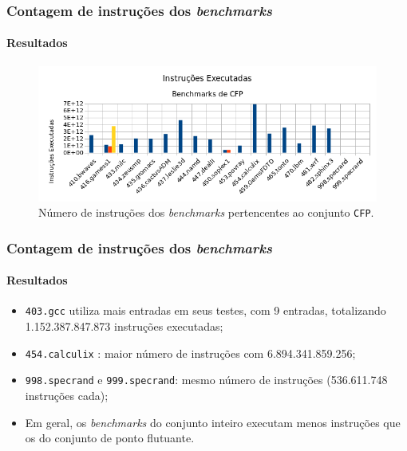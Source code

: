 \documentclass[10pt]{beamer}
\begin{document}
\begin{frame}
\frametitle{Contagem de instruções dos \textit{benchmarks}}
\framesubtitle{Resultados}

\begin{figure}[h!]
\centering
\label{fig:cfp}
\includegraphics[width=0.9\linewidth]{cfp}
\caption{Número de instruções dos \textit{benchmarks} pertencentes ao conjunto \texttt{CFP}.}
\end{figure}
\end{frame}

\begin{frame}
\frametitle{Contagem de instruções dos \textit{benchmarks}}
\framesubtitle{Resultados}

\begin{itemize}
  \item \texttt{403.gcc} utiliza mais entradas em
  seus testes, com 9 entradas, totalizando 1.152.387.847.873
  instruções executadas;
  \vspace{12pt}
  \item \texttt{454.calculix} : maior número de  instruções com
  6.894.341.859.256;
  \vspace{12pt}
  \item \texttt{998.specrand} e \texttt{999.specrand}: mesmo número de
  instruções (536.611.748 instruções cada);
  \vspace{12pt}
  \item Em geral, os \textit{benchmarks} do conjunto inteiro executam menos instruções
  que os do conjunto de ponto flutuante.
\end{itemize}

\end{frame}
\end{document}
